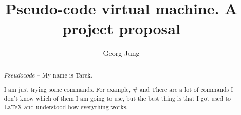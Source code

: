 \documentclass[a4paper]{article}
\author{Georg Jung}
\title{Pseudo-code virtual machine. A project proposal}
\begin{document}
\maketitle

\begin{abstract}
  $ Pseudo code $ -- My name is Tarek.
  
  I am just trying some commands. For example, \# and 
  There are a lot of commands I don't know which of them I am going to use, but the best thing is that I got used to LaTeX and understood how everything works.
  
\end{abstract}
\end{document}
